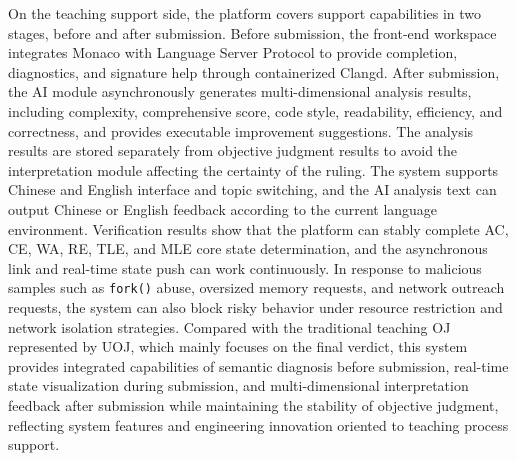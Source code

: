 \begin{abstractEn}
On the teaching support side, the platform covers support capabilities in two stages, before and after submission. Before submission, the front-end workspace integrates Monaco with Language Server Protocol to provide completion, diagnostics, and signature help through containerized Clangd. After submission, the AI module asynchronously generates multi-dimensional analysis results, including complexity, comprehensive score, code style, readability, efficiency, and correctness, and provides executable improvement suggestions. The analysis results are stored separately from objective judgment results to avoid the interpretation module affecting the certainty of the ruling. The system supports Chinese and English interface and topic switching, and the AI analysis text can output Chinese or English feedback according to the current language environment. Verification results show that the platform can stably complete AC, CE, WA, RE, TLE, and MLE core state determination, and the asynchronous link and real-time state push can work continuously. In response to malicious samples such as \texttt{fork()} abuse, oversized memory requests, and network outreach requests, the system can also block risky behavior under resource restriction and network isolation strategies. Compared with the traditional teaching OJ represented by UOJ, which mainly focuses on the final verdict, this system provides integrated capabilities of semantic diagnosis before submission, real-time state visualization during submission, and multi-dimensional interpretation feedback after submission while maintaining the stability of objective judgment, reflecting system features and engineering innovation oriented to teaching process support.

\end{abstractEn}

